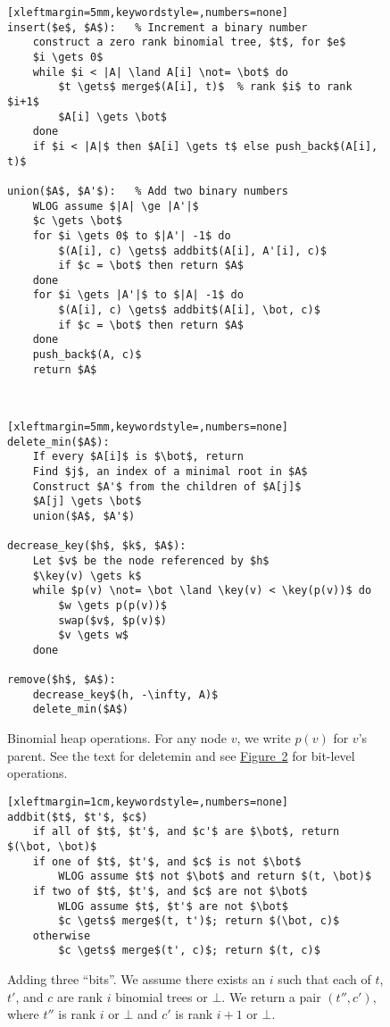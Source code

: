 \documentclass[a4paper]{article}
\DeclareMathOperator{\key}{key}
\newcommand{\any}{{\rule[-.2ex]{1ex}{.4pt}}}	%
\newcommand*{\figref}[1]{\hyperref[#1]{Figure~\ref*{#1}}}
\begin{document}
\begin{figure}
\begin{minipage}{0.49\textwidth}
\begin{lstlisting}[xleftmargin=5mm,keywordstyle=,numbers=none]
insert($e$, $A$):	% Increment a binary number
	construct a zero rank binomial tree, $t$, for $e$
	$i \gets 0$
	while $i < |A| \land A[i] \not= \bot$ do
		$t \gets$ merge$(A[i], t)$	% rank $i$ to rank $i+1$
		$A[i] \gets \bot$
	done
	if $i < |A|$ then $A[i] \gets t$ else push_back$(A[i], t)$

union($A$, $A'$):	% Add two binary numbers
	WLOG assume $|A| \ge |A'|$
	$c \gets \bot$
	for $i \gets 0$ to $|A'| -1$ do
		$(A[i], c) \gets$ addbit$(A[i], A'[i], c)$
		if $c = \bot$ then return $A$
	done
	for $i \gets |A'|$ to $|A| -1$ do
		$(A[i], c) \gets$ addbit$(A[i], \bot, c)$
		if $c = \bot$ then return $A$
	done
	push_back$(A, c)$
	return $A$
\end{lstlisting}
\end{minipage}
~~\vrule~~
\begin{minipage}{0.49\textwidth}
\begin{lstlisting}[xleftmargin=5mm,keywordstyle=,numbers=none]
delete_min($A$):
	If every $A[i]$ is $\bot$, return
	Find $j$, an index of a minimal root in $A$
	Construct $A'$ from the children of $A[j]$
	$A[j] \gets \bot$
	union($A$, $A'$)

decrease_key($h$, $k$, $A$):
	Let $v$ be the node referenced by $h$
	$\key(v) \gets k$
	while $p(v) \not= \bot \land \key(v) < \key(p(v))$ do
		$w \gets p(p(v))$
		swap($v$, $p(v)$)
		$v \gets w$
	done

remove($h$, $A$):
	decrease_key$(h, -\infty, A)$
	delete_min($A$)
\end{lstlisting}
\end{minipage}
\caption{%
	Binomial heap operations.
	For any node $v$, we write $p(v)$ for $v$'s parent.
	See the text for delete\protect\any{}min and see \figref{fig:binheapbit} for bit-level operations.
}
\label{fig:binheap}
\end{figure}

\begin{figure}
\begin{lstlisting}[xleftmargin=1cm,keywordstyle=,numbers=none]
addbit($t$, $t'$, $c$)
	if all of $t$, $t'$, and $c'$ are $\bot$, return $(\bot, \bot)$
	if one of $t$, $t'$, and $c$ is not $\bot$
		WLOG assume $t$ not $\bot$ and return $(t, \bot)$
	if two of $t$, $t'$, and $c$ are not $\bot$
		WLOG assume $t$, $t'$ are not $\bot$
		$c \gets$ merge$(t, t')$; return $(\bot, c)$
	otherwise
		$c \gets$ merge$(t', c)$; return $(t, c)$
\end{lstlisting}
\caption{%
	Adding three ``bits''.
	We assume there exists an $i$ such that each of $t$, $t'$, and $c$ are rank $i$ binomial trees or $\bot$.
	We return a pair $(t'', c')$, where $t''$ is rank $i$ or $\bot$ and $c'$ is rank $i+1$ or $\bot$.
}
\label{fig:binheapbit}
\end{figure}
\end{document}
